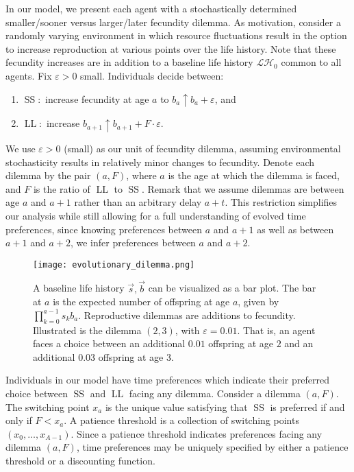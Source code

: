 \documentclass[titlepage, hidelinks, 12pt]{article}
\theoremstyle{plain}
\theoremstyle{remark}
\theoremstyle{definition}
\newcommand{\LH}{\mathcal{LH}}
\DeclareMathOperator{\smallersooner}{SS}
\DeclareMathOperator{\largerlater}{LL}
\begin{document}
In our model, we present each agent with a stochastically determined
smaller/sooner versus larger/later fecundity dilemma.  As motivation, consider
a randomly varying environment in which resource fluctuations result in the option to
increase reproduction at various points over the life history. Note that these fecundity increases are in addition to a baseline life history
$\LH_0$ common to all agents.  
Fix $\varepsilon > 0$ small.  
Individuals decide between:
\begin{enumerate}
    \item $\smallersooner:$ increase fecundity at age $a$ to $b_a\uparrow b_{a} + \varepsilon$, and
    \item $\largerlater:$ increase $b_{a+1}\uparrow b_{a+1} + F\cdot \varepsilon$.
\end{enumerate}

We use $\varepsilon > 0$ (small) as our unit of fecundity dilemma, assuming environmental stochasticity results in relatively minor changes to 
fecundity. 
Denote each dilemma by the pair $(a, F)$, where $a$ is the age at which the dilemma is faced,
and $F$ is the ratio of $\largerlater$ to $\smallersooner$. 
Remark that we assume dilemmas are between age $a$ and $a+1$ rather than an arbitrary delay $a+t$. This restriction simplifies our analysis
while still allowing for a full understanding of evolved time preferences, since knowing preferences between $a$ and $a+1$ as well as between
$a+1$ and $a+2$, we infer preferences between $a$ and $a+2$. 

\begin{figure}[H]
    \centering
    \texttt{[image: evolutionary\_dilemma.png]}
    \caption[Baseline life history and reproductive dilemma example.]{A baseline life history $\vec{s}, \vec{b}$ can be visualized as a bar plot. The bar at $a$ is the expected number of offspring at
        age $a$, given by
    $\prod_{k = 0}^{a-1} s_k b_a$. Reproductive dilemmas are additions to fecundity. Illustrated is the dilemma $(2, 3)$, with
$\varepsilon = 0.01$. That is, an agent faces a choice between an additional $0.01$ offspring at age $2$ and an additional $0.03$ offspring
at age $3$.} 
\end{figure}

Individuals in our model have time preferences which indicate their preferred choice between $\smallersooner$ and $\largerlater$ facing any
dilemma. 
Consider a dilemma $(a, F)$. The switching point $x_a$ is the unique value satisfying that $\smallersooner$ is preferred
if and only if $F < x_a$. 
A patience threshold is a collection of switching points $(x_0, \ldots, x_{A-1})$.
Since a patience threshold indicates preferences facing any dilemma $(a, F)$, time preferences may be uniquely 
specified by either a patience threshold or a discounting function. 
\end{document}
